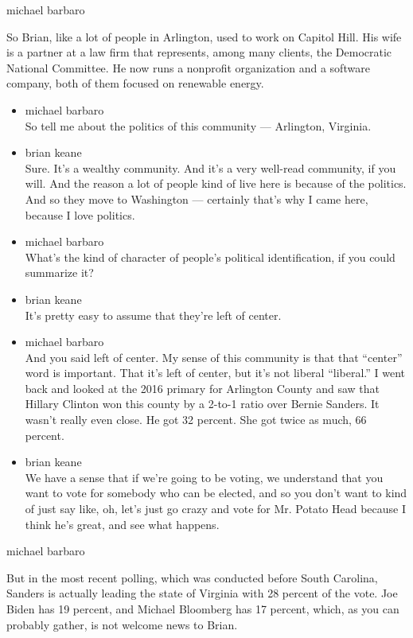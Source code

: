michael barbaro

So Brian, like a lot of people in Arlington, used to work on Capitol
Hill. His wife is a partner at a law firm that represents, among many
clients, the Democratic National Committee. He now runs a nonprofit
organization and a software company, both of them focused on renewable
energy.

\begin{itemize}
\item
  michael barbaro\\
  So tell me about the politics of this community --- Arlington,
  Virginia.
\item
  brian keane\\
  Sure. It's a wealthy community. And it's a very well-read community,
  if you will. And the reason a lot of people kind of live here is
  because of the politics. And so they move to Washington --- certainly
  that's why I came here, because I love politics.
\item
  michael barbaro\\
  What's the kind of character of people's political identification, if
  you could summarize it?
\item
  brian keane\\
  It's pretty easy to assume that they're left of center.
\item
  michael barbaro\\
  And you said left of center. My sense of this community is that that
  ``center'' word is important. That it's left of center, but it's not
  liberal ``liberal.'' I went back and looked at the 2016 primary for
  Arlington County and saw that Hillary Clinton won this county by a
  2-to-1 ratio over Bernie Sanders. It wasn't really even close. He got
  32 percent. She got twice as much, 66 percent.
\item
  brian keane\\
  We have a sense that if we're going to be voting, we understand that
  you want to vote for somebody who can be elected, and so you don't
  want to kind of just say like, oh, let's just go crazy and vote for
  Mr. Potato Head because I think he's great, and see what happens.
\end{itemize}

michael barbaro

But in the most recent polling, which was conducted before South
Carolina, Sanders is actually leading the state of Virginia with 28
percent of the vote. Joe Biden has 19 percent, and Michael Bloomberg has
17 percent, which, as you can probably gather, is not welcome news to
Brian.

